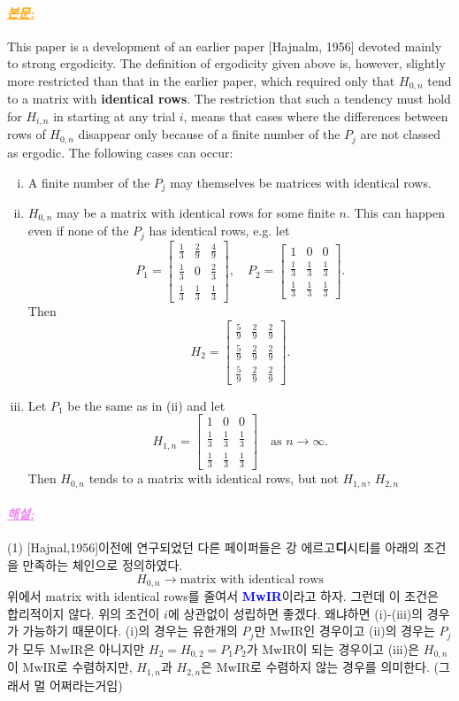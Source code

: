 \documentclass[12pt,oneside,english,a4paper]{article}
\newcommand{\paraviolet}[1]{\paragraph{\LARGE\textcolor{violet}{\it\underline{\textbf{#1:}}}}\LARGE}
\newcommand{\paraorange}[1]{\paragraph{\LARGE\textcolor{orange}{\it\underline{\textbf{#1:}}}}\LARGE}
\begin{document}
\paraorange{본문} This paper is a development of an earlier paper [Hajnalm, 1956] devoted mainly to strong ergodicity. The definition of ergodicity given above is, however, slightly more restricted
than that in the earlier paper, which required only that $H_{0,n}$ tend to a matrix with {\bf identical rows}. The restriction that such a tendency must hold for $H_{i,n}$ in starting at any
trial $i$, means that cases where the differences between rows of $H_{0,n}$ disappear only because of a finite number of the $P_j$ are not classed as ergodic. The following cases can occur:
\begin{enumerate}[(i)]
	\item A finite number of the $P_j$ may themselves be matrices with identical rows.
	\item $H_{0,n}$ may be a matrix with identical rows for some finite $n$. This can happen even if none of the $P_j$ has identical rows, e.g. let 
	\[
	P_1=\begin{bmatrix}
	\frac{1}{3} & \frac{2}{9} & \frac{4}{9} \\
	\frac{1}{3} & 0 & \frac{2}{3} \\
	\frac{1}{3} & \frac{1}{3} & \frac{1}{3} 
	\end{bmatrix},\quad 
	P_2=\begin{bmatrix}
	1 & 0 & 0 \\
	\frac{1}{3} & \frac{1}{3} & \frac{1}{3} \\
	\frac{1}{3} & \frac{1}{3} & \frac{1}{3} 
	\end{bmatrix}.
	\]
	Then 
	\[
	H_2=\begin{bmatrix}
	\frac{5}{9} & \frac{2}{9} & \frac{2}{9} \\
	\frac{5}{9} & \frac{2}{9} & \frac{2}{9} \\
	\frac{5}{9} & \frac{2}{9} & \frac{2}{9} 
	\end{bmatrix}.
	\]
	\item Let $P_1$ be the same as in (ii) and let 
	\[
	H_{1,n}=\begin{bmatrix}
	1 & 0 & 0 \\
	\frac{1}{3} & \frac{1}{3} & \frac{1}{3} \\
	\frac{1}{3} & \frac{1}{3} & \frac{1}{3} 
	\end{bmatrix} \quad\mbox{as } n\to\infty.
	\]
	Then $H_{0,n}$ tends to a matrix with identical rows, but not $H_{1,n}$, $H_{2,n}$
\end{enumerate}

\paraviolet{해설} (1) [Hajnal,1956]이전에 연구되었던 다른 페이퍼들은 강 에르고{\bf 디}시티를 아래의 조건을 만족하는 체인으로 정의하였다. 
\[
H_{0,n}\to \mbox{matrix with identical rows}
\]
위에서 matrix with identical rows를 줄여서 \textcolor{blue}{\bf MwIR}이라고 하자. 그런데 이 조건은 합리적이지 않다. 위의 조건이 $i$에 상관없이 성립하면 좋겠다. 왜냐하면 (i)-(iii)의 경우가 가능하기 때문이다. (i)의 경우는 유한개의 $P_j$만 MwIR인 경우이고 (ii)의 경우는 $P_j$가 모두 MwIR은 아니지만 $H_2=H_{0,2}=P_1P_2$가 MwIR이 되는 경우이고 (iii)은 $H_{0,n}$이 MwIR로 수렴하지만, $H_{1,n}$과 $H_{2,n}$은 MwIR로 수렴하지 않는 경우를 의미한다. (그래서 멀 어쩌라는거임)
\end{document}
